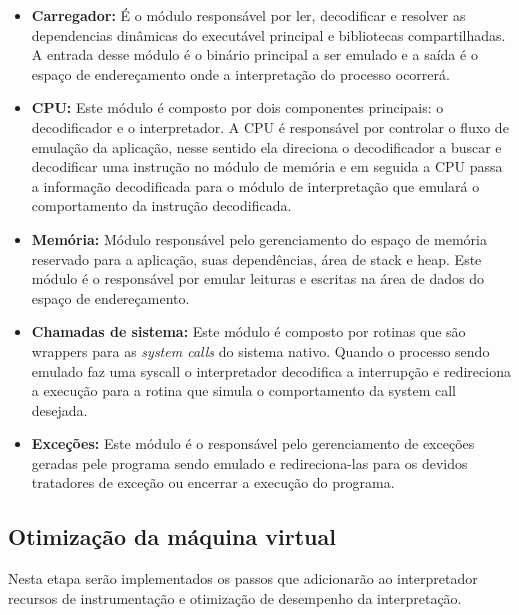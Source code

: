 \documentclass[11pt,twoside]{article}
\begin{document}
\begin{itemize}
    \item \textbf{Carregador:} É o módulo responsável por ler, decodificar e resolver as
    dependencias dinâmicas do executável principal e bibliotecas compartilhadas. A entrada 
    desse módulo é o binário principal a ser emulado e a saída é o espaço de endereçamento 
    onde a interpretação do processo ocorrerá.

    \item \textbf{CPU:} Este módulo é composto por dois componentes principais: o decodificador
    e o interpretador. A CPU é responsável por controlar o fluxo de emulação da aplicação,
    nesse sentido ela direciona o decodificador a buscar e decodificar uma instrução no
    módulo de memória e em seguida a CPU passa a informação decodificada para o módulo de 
    interpretação que emulará o comportamento da instrução decodificada.

    \item \textbf{Memória:} Módulo responsável pelo gerenciamento do espaço de memória reservado 
    para a aplicação, suas dependências, área de stack e heap. Este módulo é o responsável por
    emular leituras e escritas na área de dados do espaço de endereçamento.

    \item \textbf{Chamadas de sistema:} Este módulo é composto por rotinas que são wrappers
    para as \emph{system calls} do sistema nativo. Quando o processo sendo emulado faz uma
    syscall o interpretador decodifica a interrupção e redireciona a execução para a rotina
    que simula o comportamento da system call desejada. 
    
    \item \textbf{Exceções:} Este módulo é o responsável pelo gerenciamento de exceções 
    geradas pele programa sendo emulado e redireciona-las para os devidos tratadores de
    exceção ou encerrar a execução do programa. 
\end{itemize}

\subsection{Otimização da máquina virtual}

Nesta etapa serão implementados os passos que adicionarão ao interpretador 
recursos de instrumentação e otimização de desempenho da interpretação.
\end{document}
